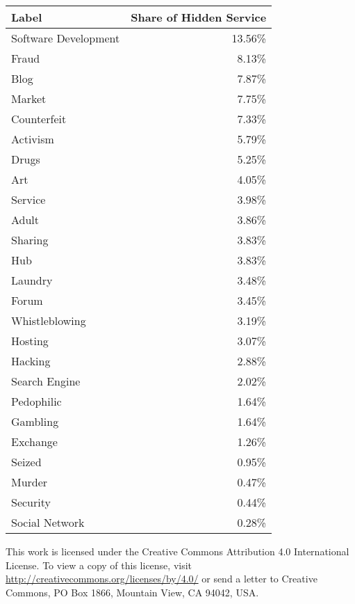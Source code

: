 \iflncs
\begin{center}
    \begin{supertabular*}{\textwidth}{l@{\extracolsep{\fill}}r}
    \textbf{Label}  & \textbf{Share of Hidden Service}\\
    \hline
    \hline
    Software Development	&	13.56\%\\
	\hline
	Fraud		&	8.13\%\\
	\hline
	Blog		&	7.87\%\\
	\hline
	Market		&	7.75\%\\
	\hline
	Counterfeit	&	7.33\%\\
	\hline
	Activism	&	5.79\%\\
	\hline
	Drugs		&	5.25\%\\
	\hline
	Art			&	4.05\%\\
	\hline
	Service		&	3.98\%\\
	\hline
	Adult		&	3.86\%\\
	\hline
	Sharing		&	3.83\%\\
	\hline
	Hub		&	3.83\%\\
	\hline
	Laundry		&	3.48\%\\
	\hline
	Forum		&	3.45\%\\
	\hline
	Whistleblowing			&	3.19\%\\
	\hline
	Hosting		&	3.07\%\\
	\hline
	Hacking		&	2.88\%\\
	\hline
	Search Engine			&	2.02\%\\
	\hline
	Pedophilic	&	1.64\%\\
	\hline
	Gambling	&	1.64\%\\
	\hline
	Exchange	&	1.26\%\\
	\hline
	Seized		&	0.95\%\\
	\hline
	Murder		&	0.47\%\\
	\hline
	Security	&	0.44\%\\
	\hline
	Social Network			&	0.28\%\\
    \end{supertabular*}
\end{center}
\fi

\iflncs
\vspace*{\fill}
\noindent This work is licensed under the Creative Commons Attribution 4.0 International License. To view a copy of this license, visit \url{http://creativecommons.org/licenses/by/4.0/} or send a letter to Creative Commons, PO Box 1866, Mountain View, CA 94042, USA.
\fi
